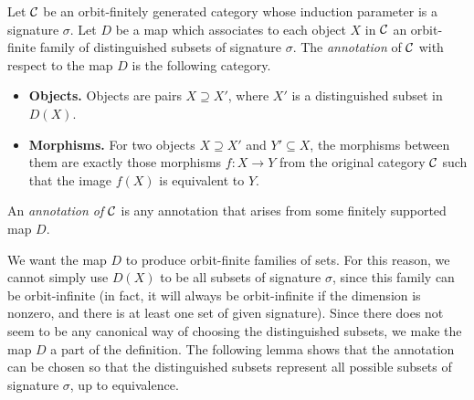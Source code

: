 \begin{definition}[Annotation] 
            Let ${\mathcal C}$ be an orbit-finitely generated category whose induction parameter is a signature $\sigma$. Let $D$ be a map which associates to each object $X$ in ${\mathcal C}$ an orbit-finite family of distinguished  subsets of signature $\sigma$.
            The \emph{annotation} of ${\mathcal C}$ with respect to the map $D$ is the following category.
    \begin{itemize}
    \item \textbf{Objects.} Objects are pairs $X \supseteq X'$, where $X'$ is a distinguished subset in $D(X)$.
    \item \textbf{Morphisms.} For two objects  $X \supseteq X'$ and $Y' \subseteq X$, the morphisms between them  are exactly those morphisms $f : X \to Y$ from the original category ${\mathcal C}$ such that 
    the image $f(X)$ is equivalent to $Y$.
\end{itemize}
An \emph{annotation of ${\mathcal C}$} is any annotation that arises from some finitely supported map $D$.
 \end{definition}

 We want the map $D$ to produce orbit-finite families of sets. For this reason, we cannot simply use $D(X)$ to be all subsets of signature $\sigma$, since this family can be orbit-infinite (in fact, it will always be orbit-infinite if the dimension is nonzero, and there is at least one set of given signature). Since there does not seem to be any canonical way of choosing the distinguished subsets, we make the map $D$ a part of the definition.  The following lemma shows that the annotation can be chosen so that the distinguished subsets represent all possible subsets of signature $\sigma$, up to equivalence.

